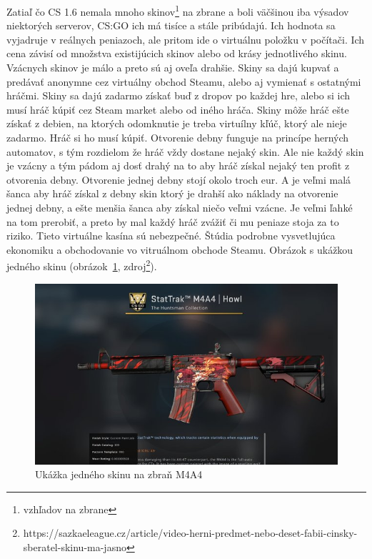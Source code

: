 \documentclass[10pt,oneside,slovak,a4paper]{article}
\begin{document}
Zatiaľ čo CS 1.6 nemala mnoho skinov\footnote{vzhľadov na zbrane} na zbrane a boli väčšinou iba výsadov niektorých serverov, CS:GO ich má tisíce a stále pribúdajú. Ich hodnota sa vyjadruje v reálnych peniazoch, ale pritom ide o virtuálnu položku v počítači. Ich cena závisí od množstva existijúcich skinov alebo od krásy jednotlivého skinu. Vzácnych skinov je málo a preto sú aj oveľa drahšie. Skiny sa dajú kupvať a predávať anonymne cez virtuálny obchod Steamu, alebo aj vymienať s ostatnými hráčmi.
Skiny sa dajú zadarmo získať buď z dropov po každej hre, alebo si ich musí hráč kúpiť cez Steam market alebo od iného hráča. Skiny môže hráč ešte získať z debien, na ktorých odomknutie je treba virtuílny kľúč, ktorý ale nieje zadarmo. Hráč si ho musí kúpiť. Otvorenie debny funguje na princípe herných automatov, s tým rozdielom že hráč vždy dostane nejaký skin. Ale nie každý skin je vzácny a tým pádom aj dosť drahý na to aby hráč získal nejaký ten profit z otvorenia debny. Otvorenie jednej debny stojí okolo troch eur. A je veľmi malá šanca aby hráč získal z debny skin ktorý je drahší ako náklady na otvorenie jednej debny, a ešte menšia šanca aby získal niečo veľmi vzácne. Je veľmi ľahké na tom prerobiť, a preto by mal každý hráč zvážiť či mu peniaze stoja za to riziko. Tieto virtuálne kasína sú nebezpečné. Štúdia podrobne vysvetlujúca ekonomiku a obchodovanie vo vitruálnom obchode Steamu\cite{7377220}. Obrázok s ukážkou jedného skinu (obrázok~\ref{f:skiny}, zdroj\footnote{https://sazkaeleague.cz/article/video-herni-predmet-nebo-deset-fabii-cinsky-sberatel-skinu-ma-jasno}).

\begin{figure}[tbh]
\centering
\includegraphics[scale=0.45]{skin.jpg}
\caption{Ukážka jedného skinu na zbraň M4A4}
\label{f:skiny}
\end{figure}
\end{document}
